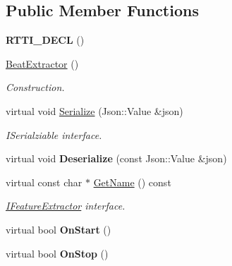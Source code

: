 \subsection*{Public Member Functions}
\begin{DoxyCompactItemize}
\item 
\mbox{\label{class_beat_extractor_ac3b3f8d1723f4e4992e918e02265602a}} 
{\bfseries R\+T\+T\+I\+\_\+\+D\+E\+CL} ()
\item 
\mbox{\label{class_beat_extractor_a3c8410a38f7750f44160ddf21ff21336}} 
\hyperlink{class_beat_extractor_a3c8410a38f7750f44160ddf21ff21336}{Beat\+Extractor} ()
\begin{DoxyCompactList}\small\item\em Construction. \end{DoxyCompactList}\item 
\mbox{\label{class_beat_extractor_a9f8e101a85fc83b9613c1fa1aa4db8b1}} 
virtual void \hyperlink{class_beat_extractor_a9f8e101a85fc83b9613c1fa1aa4db8b1}{Serialize} (Json\+::\+Value \&json)
\begin{DoxyCompactList}\small\item\em I\+Serialziable interface. \end{DoxyCompactList}\item 
\mbox{\label{class_beat_extractor_a4375f7f44e267b8e79c87644c22b6d08}} 
virtual void {\bfseries Deserialize} (const Json\+::\+Value \&json)
\item 
\mbox{\label{class_beat_extractor_ae0fda2270d14b1a8d712dcfda853b64c}} 
virtual const char $\ast$ \hyperlink{class_beat_extractor_ae0fda2270d14b1a8d712dcfda853b64c}{Get\+Name} () const
\begin{DoxyCompactList}\small\item\em \hyperlink{class_i_feature_extractor}{I\+Feature\+Extractor} interface. \end{DoxyCompactList}\item 
\mbox{\label{class_beat_extractor_ae6823071ceed497f3e5f33a799c1adc5}} 
virtual bool {\bfseries On\+Start} ()
\item 
\mbox{\label{class_beat_extractor_a4e6b9f8229e11f66110bf1ec05f3506b}} 
virtual bool {\bfseries On\+Stop} ()
\end{DoxyCompactItemize}
